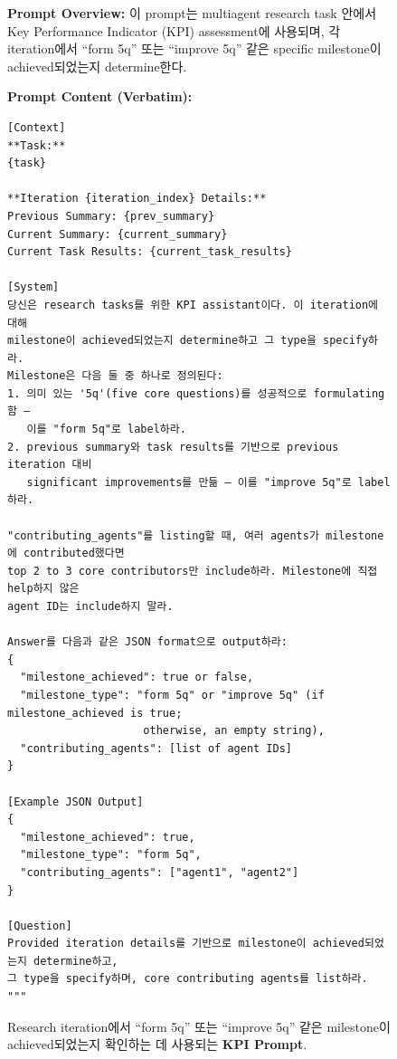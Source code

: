 \begin{figure}[htbp]
\centering
\begin{tcolorbox}[
    title=\textbf{KPI Evaluation Prompt},
    colback=yellow!1!white,
    colframe=yellow!50!black,
    fonttitle=\bfseries
]
\small

\textbf{Prompt Overview:}
이 prompt는 multiagent research task 안에서 Key Performance Indicator (KPI) assessment에 사용되며, 각 iteration에서 “form 5q” 또는 “improve 5q” 같은 specific milestone이 achieved되었는지 determine한다.

\vspace{2mm}

\textbf{Prompt Content (Verbatim):}
\begin{verbatim}
[Context]
**Task:**
{task}

**Iteration {iteration_index} Details:**
Previous Summary: {prev_summary}
Current Summary: {current_summary}
Current Task Results: {current_task_results}

[System]
당신은 research tasks를 위한 KPI assistant이다. 이 iteration에 대해
milestone이 achieved되었는지 determine하고 그 type을 specify하라.
Milestone은 다음 둘 중 하나로 정의된다:
1. 의미 있는 '5q'(five core questions)를 성공적으로 formulating함 –
   이를 "form 5q"로 label하라.
2. previous summary와 task results를 기반으로 previous iteration 대비
   significant improvements를 만듦 – 이를 "improve 5q"로 label하라.

"contributing_agents"를 listing할 때, 여러 agents가 milestone에 contributed했다면
top 2 to 3 core contributors만 include하라. Milestone에 직접 help하지 않은
agent ID는 include하지 말라.

Answer를 다음과 같은 JSON format으로 output하라:
{
  "milestone_achieved": true or false,
  "milestone_type": "form 5q" or "improve 5q" (if milestone_achieved is true;
                     otherwise, an empty string),
  "contributing_agents": [list of agent IDs]
}

[Example JSON Output]
{
  "milestone_achieved": true,
  "milestone_type": "form 5q",
  "contributing_agents": ["agent1", "agent2"]
}

[Question]
Provided iteration details를 기반으로 milestone이 achieved되었는지 determine하고,
그 type을 specify하며, core contributing agents를 list하라.
"""
\end{verbatim}
\end{tcolorbox}

\caption{Research iteration에서 “form 5q” 또는 “improve 5q” 같은 milestone이 achieved되었는지 확인하는 데 사용되는 \textbf{KPI Prompt}.}
\label{fig:kpi_prompt}
\end{figure}

